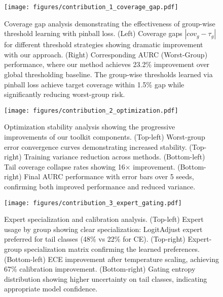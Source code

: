

\begin{figure}[htbp]
\centering
\texttt{[image: figures/contribution\_1\_coverage\_gap.pdf]}
\caption{Coverage gap analysis demonstrating the effectiveness of group-wise threshold learning with pinball loss. (Left) Coverage gaps $|cov_g - \tau_g|$ for different threshold strategies showing dramatic improvement with our approach. (Right) Corresponding AURC (Worst-Group) performance, where our method achieves 23.2\% improvement over global thresholding baseline. The group-wise thresholds learned via pinball loss achieve target coverage within 1.5\% gap while significantly reducing worst-group risk.}
\label{fig:coverage_gap}
\end{figure}

\begin{figure}[htbp]
\centering
\texttt{[image: figures/contribution\_2\_optimization.pdf]}
\caption{Optimization stability analysis showing the progressive improvements of our toolkit components. (Top-left) Worst-group error convergence curves demonstrating increased stability. (Top-right) Training variance reduction across methods. (Bottom-left) Tail coverage collapse rates showing 16$\times$ improvement. (Bottom-right) Final AURC performance with error bars over 5 seeds, confirming both improved performance and reduced variance.}
\label{fig:optimization_stability}
\end{figure}

\begin{figure}[htbp]
\centering
\texttt{[image: figures/contribution\_3\_expert\_gating.pdf]}
\caption{Expert specialization and calibration analysis. (Top-left) Expert usage by group showing clear specialization: LogitAdjust expert preferred for tail classes (48\% vs 22\% for CE). (Top-right) Expert-group specialization matrix confirming the learned preferences. (Bottom-left) ECE improvement after temperature scaling, achieving 67\% calibration improvement. (Bottom-right) Gating entropy distribution showing higher uncertainty on tail classes, indicating appropriate model confidence.}
\label{fig:expert_gating}
\end{figure}

